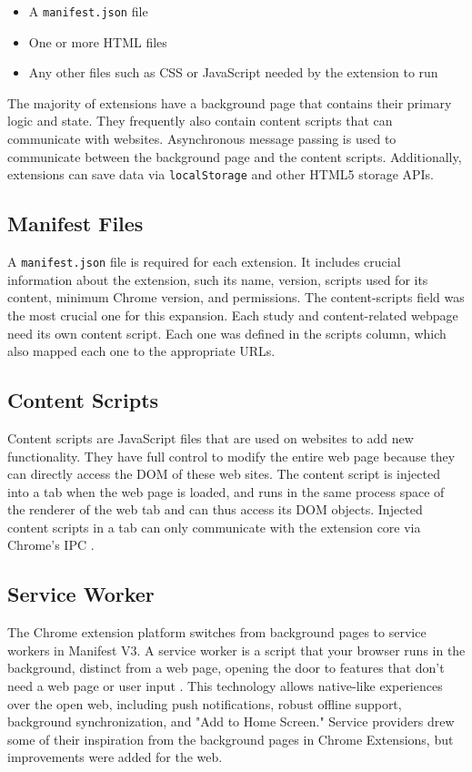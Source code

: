 \begin{itemize}
  \item A \texttt{manifest.json} file
  \item One or more HTML files
  \item Any other files such as CSS or JavaScript needed by the extension to run
\end{itemize}

The majority of extensions have a background page that contains their primary logic and state. They frequently also contain content scripts that can communicate with websites. Asynchronous message passing is used to communicate between the background page and the content scripts. Additionally, extensions can save data via \texttt{localStorage} and other HTML5 storage APIs.

\subsection{Manifest Files}
A \texttt{manifest.json} file is required for each extension. It includes crucial information about the extension, such its name, version, scripts used for its content, minimum Chrome version, and permissions. The content-scripts field was the most crucial one for this expansion. Each study and content-related webpage need its own content script. Each one was defined in the scripts column, which also mapped each one to the appropriate URLs.

\subsection{Content Scripts}
Content scripts are JavaScript files that are used on websites to add new functionality. They have full control to modify the entire web page because they can directly access the DOM of these web sites. The content script is injected into a tab when the web page is loaded, and runs in the same process space of the renderer of the web tab and can thus access its DOM objects. Injected content scripts in a tab can only communicate with the extension core via Chrome's IPC \autocite{liu2012chrome}.

\subsection{Service Worker}
\label{service_worker}
The Chrome extension platform switches from background pages to service workers in Manifest V3. A service worker is a script that your browser runs in the background, distinct from a web page, opening the door to features that don't need a web page or user input \autocite{chrome2021service}. This technology allows native-like experiences over the open web, including push notifications, robust offline support, background synchronization, and "Add to Home Screen." Service providers drew some of their inspiration from the background pages in Chrome Extensions, but improvements were added for the web.

